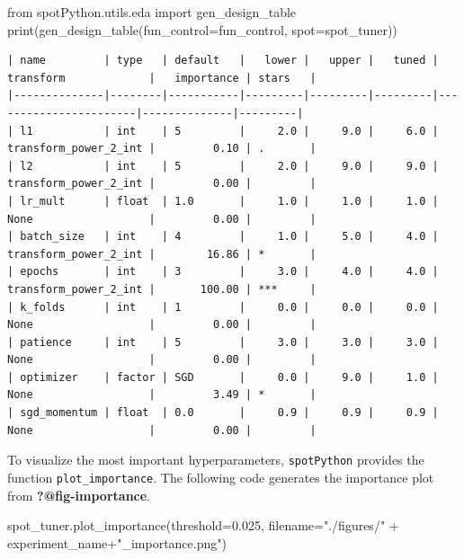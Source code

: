 \documentclass[
  letterpaper,
  DIV=11,
  numbers=noendperiod]{scrreprt}
\newenvironment{Shaded}{\begin{snugshade}}{\end{snugshade}}
\newcommand{\BuiltInTok}[1]{\textcolor[rgb]{0.00,0.23,0.31}{#1}}
\newcommand{\FloatTok}[1]{\textcolor[rgb]{0.68,0.00,0.00}{#1}}
\newcommand{\ImportTok}[1]{\textcolor[rgb]{0.00,0.46,0.62}{#1}}
\newcommand{\NormalTok}[1]{\textcolor[rgb]{0.00,0.23,0.31}{#1}}
\newcommand{\OperatorTok}[1]{\textcolor[rgb]{0.37,0.37,0.37}{#1}}
\newcommand{\StringTok}[1]{\textcolor[rgb]{0.13,0.47,0.30}{#1}}
\begin{document}
\begin{Shaded}
\begin{Highlighting}[]
\ImportTok{from}\NormalTok{ spotPython.utils.eda }\ImportTok{import}\NormalTok{ gen\_design\_table}
\BuiltInTok{print}\NormalTok{(gen\_design\_table(fun\_control}\OperatorTok{=}\NormalTok{fun\_control, spot}\OperatorTok{=}\NormalTok{spot\_tuner))}
\end{Highlighting}
\end{Shaded}

\begin{verbatim}
| name         | type   | default   |   lower |   upper |   tuned | transform             |   importance | stars   |
|--------------|--------|-----------|---------|---------|---------|-----------------------|--------------|---------|
| l1           | int    | 5         |     2.0 |     9.0 |     6.0 | transform_power_2_int |         0.10 | .       |
| l2           | int    | 5         |     2.0 |     9.0 |     9.0 | transform_power_2_int |         0.00 |         |
| lr_mult      | float  | 1.0       |     1.0 |     1.0 |     1.0 | None                  |         0.00 |         |
| batch_size   | int    | 4         |     1.0 |     5.0 |     4.0 | transform_power_2_int |        16.86 | *       |
| epochs       | int    | 3         |     3.0 |     4.0 |     4.0 | transform_power_2_int |       100.00 | ***     |
| k_folds      | int    | 1         |     0.0 |     0.0 |     0.0 | None                  |         0.00 |         |
| patience     | int    | 5         |     3.0 |     3.0 |     3.0 | None                  |         0.00 |         |
| optimizer    | factor | SGD       |     0.0 |     9.0 |     1.0 | None                  |         3.49 | *       |
| sgd_momentum | float  | 0.0       |     0.9 |     0.9 |     0.9 | None                  |         0.00 |         |
\end{verbatim}

To visualize the most important hyperparameters, \texttt{spotPython}
provides the function \texttt{plot\_importance}. The following code
generates the importance plot from \textbf{?@fig-importance}.

\begin{Shaded}
\begin{Highlighting}[]
\NormalTok{spot\_tuner.plot\_importance(threshold}\OperatorTok{=}\FloatTok{0.025}\NormalTok{,}
\NormalTok{    filename}\OperatorTok{=}\StringTok{"./figures/"} \OperatorTok{+}\NormalTok{ experiment\_name}\OperatorTok{+}\StringTok{"\_importance.png"}\NormalTok{)}
\end{Highlighting}
\end{Shaded}
\end{document}
